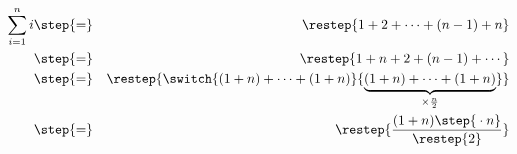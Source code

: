 \documentclass[landscape]{foils}
\begin{document}
\parstepwise
{%
  \begin{eqnarray}
    \sum_{i=1}^{n} i & \step{=} & \restep{1 + 2 + \cdots + (n-1) + n}\\
                     & \step{=} & \restep{1 + n + 2 + (n-1) + \cdots}\\
                     & \step{=} & \restep
                                  {%
                                    \switch
                                    {%
                                      \vphantom{\underbrace{(1 + n) + \cdots + (1 + n)}_{\times\frac{n}{2}}}%
                                      (1 + n) + \cdots + (1 + n)%
                                      }
                                    {\underbrace{(1 + n) + \cdots + (1 + n)}_{\times\frac{n}{2}}}%
                                    }
                                  \\
                     & \step{=} & \restep{\frac{(1 + n)\step{{}\cdot n}}{\restep{2}}}
  \end{eqnarray}
}




\end{document}
